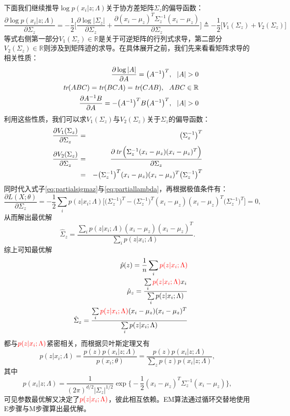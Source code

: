 下面我们继续推导$\log p(x_i|z;\Lambda)$关于协方差矩阵$\Sigma_z$的偏导函数：
\begin{equation}\label{eq:partialsigmaz}
    \frac{\partial \log p(x_i|z;\Lambda)}{\partial \Sigma_z} = -\frac{1}{2} \Big[\frac{\partial \log |\Sigma_z|}{\partial \Sigma_z} + \frac{\partial (x_i - \mu_z)^T \Sigma_z^{-1} (x_i - \mu_z)}{\partial \Sigma_z}\Big]
    \triangleq -\frac{1}{2}\big[V_1(\Sigma_z) + V_2(\Sigma_z)\big]
\end{equation}
等式右侧第一部分$V_1(\Sigma_z)\in \mathbb R$是关于可逆矩阵的行列式求导，第二部分$V_2(\Sigma_z)\in \mathbb R$则涉及到矩阵迹的求导。在具体展开之前，我们先来看看矩阵求导的相关性质：
\begin{eqnarray}
  &&\frac{\partial \log |A|}{\partial A} = \big(A^{-1}\big)^T,~~|A|>0 \\
  &&\tr(ABC) = \tr(BCA) = \tr(CAB), ~~ABC\in \mathbb R \\
  &&\frac{\partial A^{-1} B}{\partial A} = -\big(A^{-1}\big)^T B \big(A^{-1}\big)^T, ~~|A|>0
\end{eqnarray}
利用这些性质，我们可以求$V_1(\Sigma_z)$与$V_2(\Sigma_z)$关于$\Sigma_z$的偏导函数：
\begin{eqnarray}
    \frac{\partial V_1(\Sigma_z)}{\partial \Sigma_z} &=& \big(\Sigma_z^{-1}\big)^T\\
    \frac{\partial V_2(\Sigma_z)}{\partial \Sigma_z} &=& \frac{\partial \operatorname{\textit{tr}}\Big(\Sigma_z^{-1} (x_i - \mu_z)(x_i - \mu_z)^T\Big)}{\partial \Sigma_z}\\
    &=& -\big(\Sigma_z^{-1}\big)^T (x_i - \mu_z)(x_i - \mu_z)^T \big(\Sigma_z^{-1}\big)^T
\end{eqnarray}
同时代入式子\eqref{eq:partialsigmaz}与\eqref{eq:partiallambda}，再根据极值条件有：
\[
    \frac{\partial L(X; \theta)}{\partial \Sigma_z} = -\frac{1}{2} \sum\limits_i p(z|x_i;\Lambda) \Big[\big(\Sigma_z^{-1}\big)^T -\big(\Sigma_z^{-1}\big)^T (x_i - \mu_z)(x_i - \mu_z)^T \big(\Sigma_z^{-1}\big)^T \Big]
    =0,
\]
从而解出最优解
\begin{equation}\label{optimalsigmaz}
    \hat \Sigma_z = \frac{\sum\limits_i p(z|x_i;\Lambda) (x_i - \mu_z)(x_i - \mu_z)^T }{\sum\limits_i p(z|x_i;\Lambda)}.
\end{equation}
综上可知最优解
\begin{eqnarray}
  &&\hat p(z) =  \frac{1}{n} \sum\limits_i \textcolor{red}{p(z|x_i;\Lambda)}\\
  &&\hat \mu_z = \frac{\sum\limits_i \textcolor{red}{p(z|x_i;\Lambda)} x_i}{\sum\limits_i p(z|x_i;\Lambda)}\\
  &&\hat \Sigma_z = \frac{\sum\limits_i \textcolor{red}{p(z|x_i;\Lambda)} (x_i - \mu_z)(x_i - \mu_z)^T }{\sum\limits_i p(z|x_i;\Lambda)}
\end{eqnarray}
都与$\textcolor{red}{p(z|x_i;\Lambda)}$紧密相关，而根据贝叶斯定理又有
\[
    p(z|x_i;\Lambda) = \frac{p(z)p(x_i|z;\Lambda)}{p(x_i;\theta)} = \frac{p(z)p(x_i|z;\Lambda)}{\sum\limits_z p(z) p(x_i|z;\Lambda)},
\]
其中
\[
    p(x_i|z;\Lambda) = \frac{1}{(2\pi)^{d/2} |\Sigma_z|^{1/2}} \exp \Big\{-\frac{1}{2} (x_i-\mu_z)^T \Sigma_z^{-1} (x_i-\mu_z)\Big\},
\]
可见参数最优解又决定了$\textcolor{red}{p(z|x_i;\Lambda)}$，彼此相互依赖。EM算法通过循环交替地使用E步骤与M步骤算出最优解。


